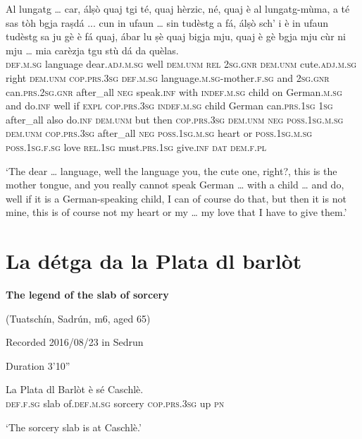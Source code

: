 \begin{linenumbers}
\gll    Al lungatg … car, álṣò quaj tgi té, quaj hèrzic, né, quaj è al lungatg-mùma, a té sas tòh bgja raṣdá ... cun in ufaun … sin tudèstg a fá, álṣò sch’ i è in ufaun tudèstg sa ju gè è fá quaj, ábar lu ṣè quaj bigja mju, quaj è gè bgja mju cùr ni mju … mia carèzja tgu stù dá da quèlas.\\ 
 \textsc{def.m.sg} language {} dear.\textsc{adj.m.sg} well \textsc{dem.unm} \textsc{rel} \textsc{2sg.gnr} \textsc{dem.unm} cute.\textsc{adj.m.sg} right \textsc{dem.unm} \textsc{cop.prs.3sg} \textsc{def.m.sg} language.\textsc{m.sg}-mother.\textsc{f.sg} and \textsc{2sg.gnr} can.\textsc{prs.2sg.gnr} after\_all \textsc{neg} speak.\textsc{inf} {} with \textsc{indef.m.sg} child {} on German.\textsc{m.sg} and do.\textsc{inf} well if \textsc{expl} \textsc{cop.prs.3sg} \textsc{indef.m.sg} child German can.\textsc{prs.1sg} \textsc{1sg} after\_all also do.\textsc{inf} \textsc{dem.unm} but then \textsc{cop.prs.3sg} \textsc{dem.unm} \textsc{neg} \textsc{poss.1sg.m.sg} \textsc{dem.unm} \textsc{cop.prs.3sg} after\_all \textsc{neg} \textsc{poss.1sg.m.sg} heart or \textsc{poss.1sg.m.sg} {} \textsc{poss.1sg.f.sg} love \textsc{rel.1sg} must.\textsc{prs.1sg} give.\textsc{inf} \textsc{dat} \textsc{dem.f.pl}\\
\end{linenumbers}
\medskip
\glt `The dear … language, well the language you, the cute one, right?, this is the mother tongue, and you really cannot speak German … with a child … and do, well if it is a German-speaking child, I can of course do that, but then it is not mine, this is of course not my heart or my … my love that I have to give them.'
\medskip


\section{La détga da la Plata dl barlòt}\label{sec:8.5}

\noindent
\textbf{The legend of the slab of sorcery}

\noindent
(Tuatschín, Sadrún, m6, aged 65)

\noindent
Recorded 2016/08/23 in Sedrun

\noindent
Duration 3'10''

\bigskip

\begin{linenumbers}
\gll    La Plata dl Barlòt è sé Caschlè.\\
 \textsc{def.f.sg} slab of.\textsc{def.m.sg} sorcery \textsc{cop.prs.3sg} up \textsc{pn}\\
\end{linenumbers}
\medskip
\glt `The sorcery slab is at Caschlè.'
\medskip

